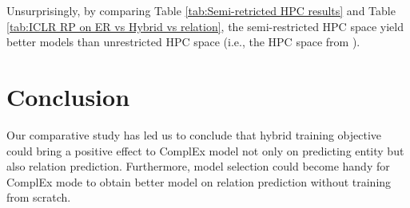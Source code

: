 Unsurprisingly, by comparing Table \ref{tab:Semi-retricted HPC results} and Table \ref{tab:ICLR RP on ER vs Hybrid vs relation}, the semi-restricted HPC space yield better models than unrestricted HPC space (i.e., the HPC space from \cite{Ruffinelli2020You}).



\section{Conclusion}
Our comparative study has led us to conclude that hybrid training objective could bring a positive effect to ComplEx model not only on predicting entity but also relation prediction. Furthermore, model selection could become handy for ComplEx mode to obtain better model on relation prediction without training from scratch.  



